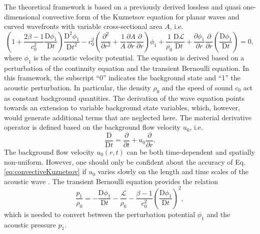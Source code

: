 The theoretical framework is based on a previously derived lossless and quasi one-dimensional convective form of the Kuznetsov equation for planar waves and curved wavefronts with variable cross-sectional area $A$, i.e.
\begin{equation}
    \left(1 + \dfrac{2\beta - 1}{c_0^2}\dfrac{\mathrm{D}\phi_1}{\mathrm{D}t}\right)\dfrac{\mathrm{D}^2\phi_1}{\mathrm{D}t^2}
    - c_0^2\left(\dfrac{\partial^2}{\partial r^2} + \dfrac{1}{A}\dfrac{\partial A}{\partial
        r}\dfrac{\partial}{\partial r}\right)\phi_1
    + \dfrac{1}{\rho_0}\dfrac{\mathrm{D}\mathcal{L}}{\mathrm{D}t}
    + \dfrac{\partial \phi_1}{\partial r}\dfrac{\partial}{\partial r}\left(\dfrac{\mathrm{D}\phi_1}{\mathrm{D}t}\right) = 0,
    \label{eq:convectiveKuznetsov}
\end{equation}
where $\phi_1$ is the acoustic velocity potential. The equation is derived based on a perturbation of the continuity equation and the transient Bernoulli equation. In this framework, the subscript ``0'' indicates the background state and ``1'' the acoustic perturbation. In particular, the density $\rho_0$ and the speed of sound $c_0$ act as constant background quantities. The derivation of the wave equation points towards an extension to variable background state variables, which, however, would generate additional terms that are neglected here. The material derivative operator is defined based on the background flow velocity $u_0$, i.e.
\begin{equation}
    \dfrac{\mathrm{D}}{\mathrm{D}t} = \dfrac{\partial}{\partial t} + u_0 \dfrac{\partial}{\partial r}.
    \label{eq:MaterialDerivative}
\end{equation}
The background flow velocity $u_0\left(r,t\right)$ can be both time-dependent and spatially non-uniform. However, one should only be confident about the accuracy of Eq. \eqref{eq:convectiveKuznetsov} if $u_0$ varies slowly on the length and time scales of the acoustic wave \citep{Pierce_1990}. The transient Bernoulli equation provides the relation
\begin{equation}
    \dfrac{p_1}{\rho_0} = - \dfrac{\mathrm{D}\phi_1}{\mathrm{D}t} - \dfrac{\mathcal{L}}{\rho_0} - \dfrac{\beta - 1}{c_0^2}\left(\dfrac{\mathrm{D}\phi_1}{\mathrm{D}t}\right)^2,
    \label{eq:p1pi1}
\end{equation}
which is needed to convert between the perturbation potential $\phi_1$ and the acoustic pressure $p_1$.

